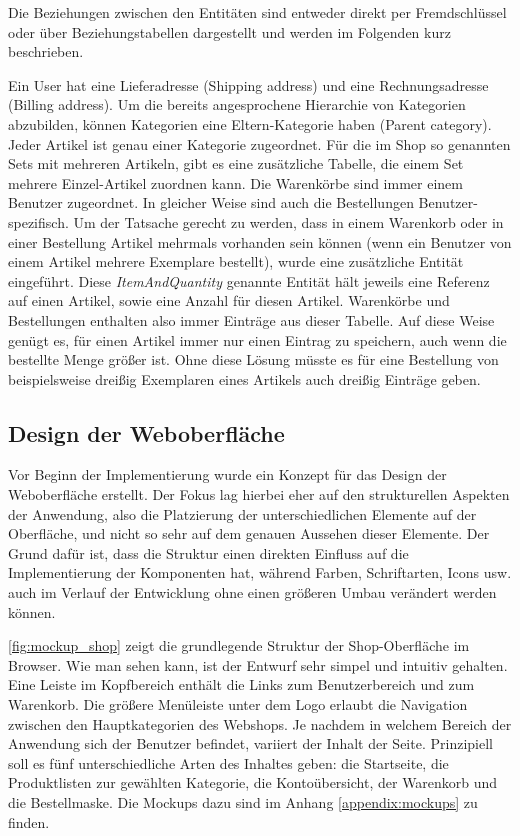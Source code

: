 Die Beziehungen zwischen den Entitäten sind entweder direkt per Fremdschlüssel oder über Beziehungstabellen dargestellt und werden im Folgenden kurz beschrieben.

Ein User hat eine Lieferadresse (Shipping address) und eine Rechnungsadresse (Billing address).
Um die bereits angesprochene Hierarchie von Kategorien abzubilden, können Kategorien eine Eltern-Kategorie haben (Parent category).
Jeder Artikel ist genau einer Kategorie zugeordnet. Für die im Shop so genannten Sets mit mehreren Artikeln, gibt es eine zusätzliche Tabelle, die einem Set mehrere Einzel-Artikel zuordnen kann.
Die Warenkörbe sind immer einem Benutzer zugeordnet. In gleicher Weise sind auch die Bestellungen Benutzer-spezifisch.
Um der Tatsache gerecht zu werden, dass in einem Warenkorb oder in einer Bestellung Artikel mehrmals vorhanden sein können (wenn ein Benutzer von einem Artikel mehrere Exemplare bestellt), wurde eine zusätzliche Entität eingeführt.
Diese \textit{ItemAndQuantity} genannte Entität hält jeweils eine Referenz auf einen Artikel, sowie eine Anzahl für diesen Artikel.
Warenkörbe und Bestellungen enthalten also immer Einträge aus dieser Tabelle.
Auf diese Weise genügt es, für einen Artikel immer nur einen Eintrag zu speichern, auch wenn die bestellte Menge größer ist.
Ohne diese Lösung müsste es für eine Bestellung von beispielsweise dreißig Exemplaren eines Artikels auch dreißig Einträge geben.

\subsection{Design der Weboberfläche}
Vor Beginn der Implementierung wurde ein Konzept für das Design der Weboberfläche erstellt.
Der Fokus lag hierbei eher auf den strukturellen Aspekten der Anwendung, also die Platzierung der unterschiedlichen Elemente auf der Oberfläche, und nicht so sehr auf dem genauen Aussehen dieser Elemente.
Der Grund dafür ist, dass die Struktur einen direkten Einfluss auf die Implementierung der Komponenten hat, während Farben, Schriftarten, Icons usw. auch im Verlauf der Entwicklung ohne einen größeren Umbau verändert werden können.

\cref{fig:mockup_shop} zeigt die grundlegende Struktur der Shop-Oberfläche im Browser.
Wie man sehen kann, ist der Entwurf sehr simpel und intuitiv gehalten. Eine Leiste im Kopfbereich enthält die Links zum Benutzerbereich und zum Warenkorb.
Die größere Menüleiste unter dem Logo erlaubt die Navigation zwischen den Hauptkategorien des Webshops.
Je nachdem in welchem Bereich der Anwendung sich der Benutzer befindet, variiert der Inhalt der Seite.
Prinzipiell soll es fünf unterschiedliche Arten des Inhaltes geben: die Startseite, die Produktlisten zur gewählten Kategorie, die Kontoübersicht, der Warenkorb und die Bestellmaske.
Die Mockups dazu sind im Anhang \ref{appendix:mockups} zu finden.


